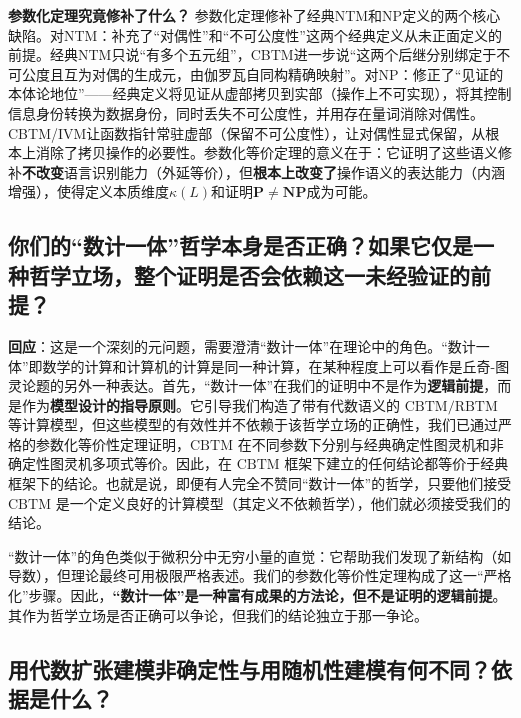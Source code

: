 \documentclass{ctexart}
\begin{document}
	\textbf{参数化定理究竟修补了什么？} 参数化定理修补了经典NTM和NP定义的两个核心缺陷。对NTM：补充了``对偶性''和``不可公度性''这两个经典定义从未正面定义的前提。经典NTM只说``有多个五元组''，CBTM进一步说``这两个后继分别绑定于不可公度且互为对偶的生成元，由伽罗瓦自同构精确映射''。对NP：修正了``见证的本体论地位''——经典定义将见证从虚部拷贝到实部（操作上不可实现），将其控制信息身份转换为数据身份，同时丢失不可公度性，并用存在量词消除对偶性。CBTM/IVM让函数指针常驻虚部（保留不可公度性），让对偶性显式保留，从根本上消除了拷贝操作的必要性。参数化等价定理的意义在于：它证明了这些语义修补\textbf{不改变}语言识别能力（外延等价），但\textbf{根本上改变了}操作语义的表达能力（内涵增强），使得定义本质维度$\kappa(L)$和证明$\mathbf{P}\neq\mathbf{NP}$成为可能。
	
	
	\subsection{你们的``数计一体''哲学本身是否正确？如果它仅是一种哲学立场，整个证明是否会依赖这一未经验证的前提？}
	
	\textbf{回应}：这是一个深刻的元问题，需要澄清``数计一体''在理论中的角色。``数计一体''即数学的计算和计算机的计算是同一种计算，在某种程度上可以看作是丘奇-图灵论题的另外一种表达。首先，``数计一体''在我们的证明中不是作为\textbf{逻辑前提}，而是作为\textbf{模型设计的指导原则}。它引导我们构造了带有代数语义的 $\text{CBTM}/\text{RBTM}$ 等计算模型，但这些模型的有效性并不依赖于该哲学立场的正确性，我们已通过严格的参数化等价性定理证明，$\text{CBTM}$ 在不同参数下分别与经典确定性图灵机和非确定性图灵机多项式等价。因此，在 $\text{CBTM}$ 框架下建立的任何结论都等价于经典框架下的结论。也就是说，即便有人完全不赞同``数计一体''的哲学，只要他们接受 $\text{CBTM}$ 是一个定义良好的计算模型（其定义不依赖哲学），他们就必须接受我们的结论。
	
	``数计一体''的角色类似于微积分中无穷小量的直觉：它帮助我们发现了新结构（如导数），但理论最终可用极限严格表述。我们的参数化等价性定理构成了这一``严格化''步骤。因此，\textbf{``数计一体''是一种富有成果的方法论，但不是证明的逻辑前提}。其作为哲学立场是否正确可以争论，但我们的结论独立于那一争论。
	
	
	\subsection{用代数扩张建模非确定性与用随机性建模有何不同？依据是什么？}
	
\end{document}
